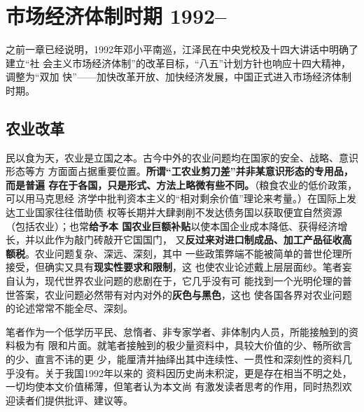 \chapter{市场经济体制时期 1992--}

之前一章已经说明，1992年邓小平南巡，江泽民在中央党校及十四大讲话中明确了建立“社
会主义市场经济体制”的改革目标，“八五”计划方针也响应十四大精神，调整为“双加
快”——加快改革开放、加快经济发展，中国正式进入市场经济体制时期。


\section{农业改革}





民以食为天，农业是立国之本。古今中外的农业问题均在国家的安全、战略、意识形态等方
方面面占据重要位置。\textbf{所谓“工农业剪刀差”并非某意识形态的专用品，而是普遍
  存在于各国，只是形式、方法上略微有些不同。}（粮食农业的低价政策，可以用马克思经
济学中批判资本主义的“相对剩余价值”理论来考量。）在国际上发达工业国家往往借助债
权等长期并大肆剥削不发达债务国以获取便宜自然资源（包括农业）；也常\textbf{给予本
  国农业巨额补贴}以使本国企业成本降低、获得经济增长，并以此作为敲门砖敲开它国国门，
又\textbf{反过来对进口制成品、加工产品征收高额税}。农业问题复杂、深远、深刻，其中
一些政策弊端不能被简单的普世伦理所接受，但确实又具有\textbf{现实性要求和限制}，这
也使农业论述戴上层层面纱。笔者妄自认为，现代世界农业问题的悲剧在于，它几乎没有可
能找到一个光明伦理的普世答案，农业问题必然带有对内对外的\textbf{灰色与黑色}，这也
使各国各界对农业问题的论述常常不能全尽、深刻。

笔者作为一个低学历平民、怠惰者、非专家学者、非体制内人员，所能接触到的资料极为有
限和片面。就笔者接触到的极少量资料中，具较大价值的少、畅所欲言的少、直言不讳的更
少，能厘清并抽绎出其中连续性、一贯性和深刻性的资料几乎没有。关于我国1992年以来的
资料因历史尚未积淀，更是存在相当不明之处，一切均使本文价值稀薄，但笔者认为本文尚
有激发读者思考的作用，同时热烈欢迎读者们提供批评、建议等。

